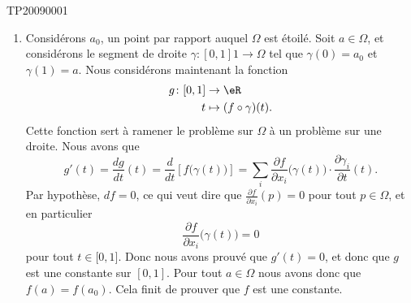 \begin{corrige}{TP20090001}
\begin{enumerate}
		\item
			Considérons $a_0$, un point par rapport auquel $\Omega$ est étoilé. Soit $a\in\Omega$, et considérons le segment de droite $\gamma\colon [0,1]1\to \Omega$ tel que $\gamma(0)=a_0$ et $\gamma(1)=a$. Nous considérons maintenant la fonction
			\begin{equation}
				\begin{aligned}
					g\colon [0,1]&\to \eR \\
					t&\mapsto (f\circ \gamma)(t). 
				\end{aligned}
			\end{equation}
			Cette fonction sert à ramener le problème sur $\Omega$ à un problème sur une droite. Nous avons que 
			\begin{equation}
				g'(t)=\frac{ dg }{ dt }(t)=\frac{ d }{ dt }\left[ f\big( \gamma(t) \big) \right]=\sum_i\frac{ \partial f }{ \partial x_i }\big( \gamma(t) \big)\cdot\frac{ \partial \gamma_i }{ \partial t }(t).
			\end{equation}
			Par hypothèse, $df=0$, ce qui veut dire que $\frac{ \partial f }{ \partial x_i }(p)=0$ pour tout $p\in\Omega$, et en particulier
			\begin{equation}
				\frac{ \partial f }{ \partial x_i }\big( \gamma(t) \big)=0
			\end{equation}
			pour tout $t\in\mathopen[ 0 , 1 \mathclose]$. Donc nous avons prouvé que $g'(t)=0$, et donc que $g$ est une constante sur $[0,1]$. Pour tout $a\in\Omega$ nous avons donc que $f(a)=f(a_0)$. Cela finit de prouver que $f$ est une constante.

	\end{enumerate}

\end{corrige}
